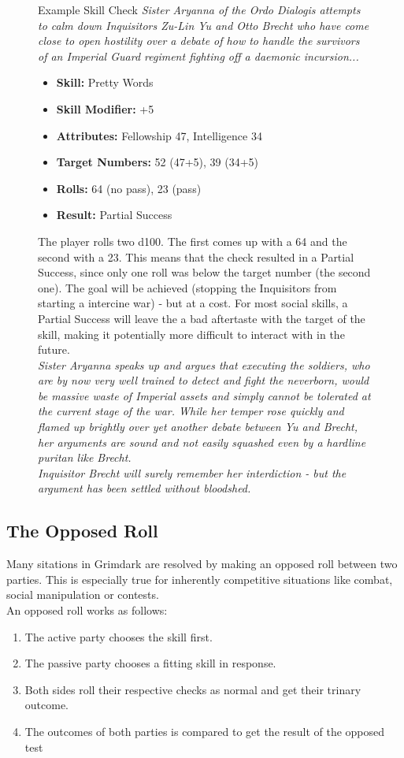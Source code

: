 \begin{figure}[ht]
	\begin{DndSidebar}{Example Skill Check}
	\textit{Sister Aryanna of the Ordo Dialogis attempts to calm down Inquisitors Zu-Lin Yu and Otto Brecht who have come close to open hostility over a debate of how to handle the survivors of an Imperial Guard regiment fighting off a daemonic incursion...}
	\begin{itemize}
		\item \textbf{Skill:} Pretty Words
		\item \textbf{Skill Modifier:} +5
		\item \textbf{Attributes:} Fellowship 47, Intelligence 34
		\item \textbf{Target Numbers:} 52 (47+5), 39 (34+5)
		\item \textbf{Rolls:} 64 (no pass), 23 (pass)
		\item \textbf{Result:} Partial Success
	\end{itemize}
	The player rolls two d100. The first comes up with a 64 and the second with a 23.
	This means that the check resulted in a Partial Success, since only one roll was below the target number (the second one).
	The goal will be achieved (stopping the Inquisitors from starting a intercine war) - but at a cost. For most social skills, a Partial Success will leave the a bad aftertaste with the target of the skill, making it potentially more difficult to interact with in the future.\\
	\textit{Sister Aryanna speaks up and argues that executing the soldiers, who are by now very well trained to detect and fight the neverborn, would be massive waste of Imperial assets and simply cannot be tolerated at the current stage of the war. While her temper rose quickly and flamed up brightly over yet another debate between Yu and Brecht, her arguments are sound and not easily squashed even by a hardline puritan like Brecht.\\
	Inquisitor Brecht will surely remember her interdiction - but the argument has been settled without bloodshed.}
	\end{DndSidebar}
\end{figure}

\subsection{The Opposed Roll}
\label{opposed_roll}
Many sitations in Grimdark are resolved by making an opposed roll between two parties.
This is especially true for inherently competitive situations like combat, social manipulation or contests.\\
An opposed roll works as follows:
\begin{enumerate}
	\item The active party chooses the skill first.
	\item The passive party chooses a fitting skill in response.
	\item Both sides roll their respective checks as normal and get their trinary outcome.
	\item The outcomes of both parties is compared to get the result of the opposed test
\end{enumerate}

